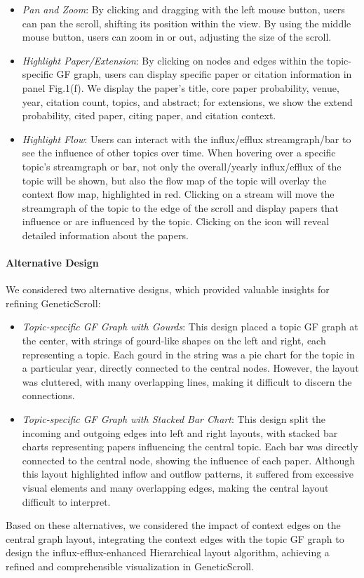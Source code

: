 \begin{itemize}
\item \emph{Pan and Zoom}: By clicking and dragging with the left mouse button, users can pan the scroll, shifting its position within the view. By using the middle mouse button, users can zoom in or out, adjusting the size of the scroll.
\item \emph{Highlight Paper/Extension}: By clicking on nodes and edges within the topic-specific GF graph, users can display specific paper or citation information in panel Fig.1(f). We display the paper's title, core paper probability, venue, year, citation count, topics, and abstract; for extensions, we show the extend probability, cited paper, citing paper, and citation context.

\item \emph{Highlight Flow}: Users can interact with the influx/efflux streamgraph/bar to see the influence of other topics over time. When hovering over a specific topic's streamgraph or bar, not only the overall/yearly influx/efflux of the topic will be shown, but also the flow map of the topic will overlay the context flow map, highlighted in red. Clicking on a stream will move the streamgraph of the topic to the edge of the scroll and display papers that influence or are influenced by the topic. Clicking on the icon will reveal detailed information about the papers.
\end{itemize}

\paragraph{Alternative Design}

We considered two alternative designs, which provided valuable insights for refining GeneticScroll:

\begin{itemize}
    \item \emph{Topic-specific GF Graph with Gourds}: This design placed a topic GF graph at the center, with strings of gourd-like shapes on the left and right, each representing a topic. Each gourd in the string was a pie chart for the topic in a particular year, directly connected to the central nodes. However, the layout was cluttered, with many overlapping lines, making it difficult to discern the connections.
    \item \emph{Topic-specific GF Graph with Stacked Bar Chart}: This design split the incoming and outgoing edges into left and right layouts, with stacked bar charts representing papers influencing the central topic. Each bar was directly connected to the central node, showing the influence of each paper. Although this layout highlighted inflow and outflow patterns, it suffered from excessive visual elements and many overlapping edges, making the central layout difficult to interpret.
\end{itemize}

Based on these alternatives, we considered the impact of context edges on the central graph layout, integrating the context edges with the topic GF graph to design the influx-efflux-enhanced Hierarchical layout algorithm, achieving a refined and comprehensible visualization in GeneticScroll. 